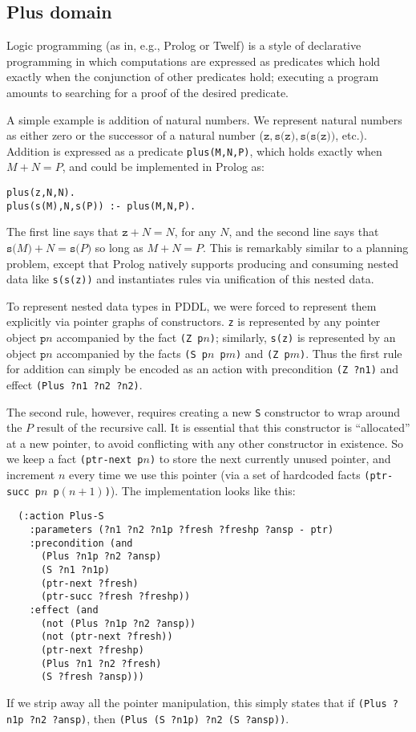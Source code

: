 
\subsection{Plus domain}

Logic programming (as in, e.g., Prolog or Twelf) is a style of declarative
programming in which computations are expressed as predicates which hold exactly
when the conjunction of other predicates hold; executing a program amounts to
searching for a proof of the desired predicate.

A simple example is addition of natural numbers. We represent natural numbers as
either zero or the successor of a natural number ($\texttt{z}, \texttt{s(z)},
\texttt{s(s(z))}$, etc.). Addition is expressed as a predicate
\texttt{plus(M,N,P)}, which holds exactly when $M+N=P$, and could be implemented
in Prolog as:
\begin{verbatim}
plus(z,N,N).
plus(s(M),N,s(P)) :- plus(M,N,P).
\end{verbatim}
The first line says that $\texttt{z}+N=N$, for any $N$, and the second line says
that $\texttt{s(}M\texttt{)}+N=\texttt{s(}P\texttt{)}$ so long as $M+N=P$. This
is remarkably similar to a planning problem, except that Prolog natively
supports producing and consuming nested data like \texttt{s(s(z))} and
instantiates rules via unification of this nested data.

To represent nested data types in PDDL, we were forced to represent them
explicitly via pointer graphs of constructors. \texttt{z} is represented by any
pointer object $\texttt{p}n$ accompanied by the fact \texttt{(Z p$n$)};
similarly, \texttt{s(z)} is represented by an object $\texttt{p}n$ accompanied
by the facts \texttt{(S p$n$ p$m$)} and \texttt{(Z p$m$)}. Thus the first rule
for addition can simply be encoded as an action with precondition \texttt{(Z
?n1)} and effect \texttt{(Plus ?n1 ?n2 ?n2)}.

The second rule, however, requires creating a new \texttt{S} constructor to wrap
around the $P$ result of the recursive call. It is essential that this
constructor is ``allocated'' at a new pointer, to avoid conflicting with any
other constructor in existence. So we keep a fact \texttt{(ptr-next p$n$)} to
store the next currently unused pointer, and increment $n$ every time we use
this pointer (via a set of hardcoded facts \texttt{(ptr-succ p$n$ p$(n+1)$)}).
The implementation looks like this:
{\small
\begin{verbatim}
  (:action Plus-S
    :parameters (?n1 ?n2 ?n1p ?fresh ?freshp ?ansp - ptr)
    :precondition (and
      (Plus ?n1p ?n2 ?ansp)
      (S ?n1 ?n1p)
      (ptr-next ?fresh)
      (ptr-succ ?fresh ?freshp))
    :effect (and
      (not (Plus ?n1p ?n2 ?ansp))
      (not (ptr-next ?fresh))
      (ptr-next ?freshp)
      (Plus ?n1 ?n2 ?fresh)
      (S ?fresh ?ansp)))
\end{verbatim}}
If we strip away all the pointer manipulation, this simply states that if
\texttt{(Plus ?n1p ?n2 ?ansp)}, then \texttt{(Plus (S ?n1p) ?n2 (S ?ansp))}.

